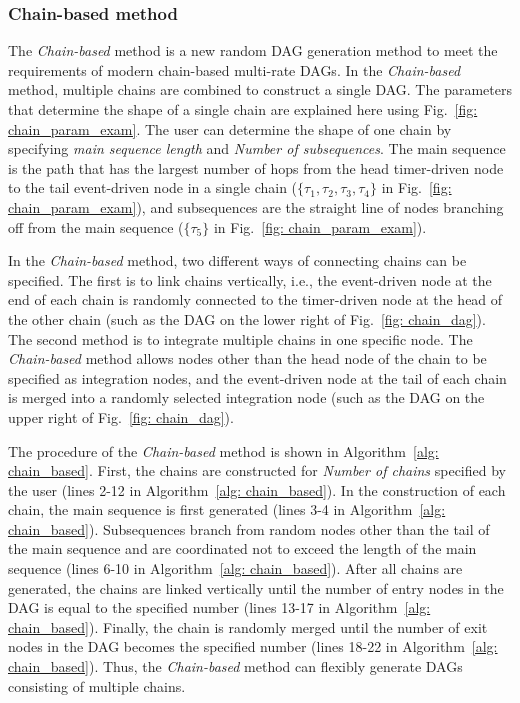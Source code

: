 \subsubsection{Chain-based method}
\label{sssec: chain_based_method}

The {\it Chain-based} method is a new random DAG generation method to meet the requirements of modern chain-based multi-rate DAGs.
In the {\it Chain-based} method, multiple chains are combined to construct a single DAG.
The parameters that determine the shape of a single chain are explained here using Fig.~\ref{fig: chain_param_exam}.
The user can determine the shape of one chain by specifying {\it main sequence length} and {\it Number of subsequences}.
The main sequence is the path that has the largest number of hops from the head timer-driven node to the tail event-driven node in a single chain ($\{\tau_1, \tau_2, \tau_3, \tau_4\}$ in Fig.~\ref{fig: chain_param_exam}), and subsequences are the straight line of nodes branching off from the main sequence ($\{\tau_5\}$ in Fig.~\ref{fig: chain_param_exam}).

In the {\it Chain-based} method, two different ways of connecting chains can be specified.
The first is to link chains vertically, i.e., the event-driven node at the end of each chain is randomly connected to the timer-driven node at the head of the other chain (such as the DAG on the lower right of Fig.~\ref{fig: chain_dag}).
The second method is to integrate multiple chains in one specific node.
The {\it Chain-based} method allows nodes other than the head node of the chain to be specified as integration nodes, and the event-driven node at the tail of each chain is merged into a randomly selected integration node (such as the DAG on the upper right of Fig.~\ref{fig: chain_dag}).

The procedure of the {\it Chain-based} method is shown in Algorithm~\ref{alg: chain_based}.
First, the chains are constructed for {\it Number of chains} specified by the user (lines 2-12 in Algorithm~\ref{alg: chain_based}).
In the construction of each chain, the main sequence is first generated (lines 3-4 in Algorithm~\ref{alg: chain_based}).
Subsequences branch from random nodes other than the tail of the main sequence and are coordinated not to exceed the length of the main sequence (lines 6-10 in Algorithm~\ref{alg: chain_based}).
After all chains are generated, the chains are linked vertically until the number of entry nodes in the DAG is equal to the specified number (lines 13-17 in Algorithm~\ref{alg: chain_based}).
Finally, the chain is randomly merged until the number of exit nodes in the DAG becomes the specified number (lines 18-22 in Algorithm~\ref{alg: chain_based}).
Thus, the {\it Chain-based} method can flexibly generate DAGs consisting of multiple chains.


